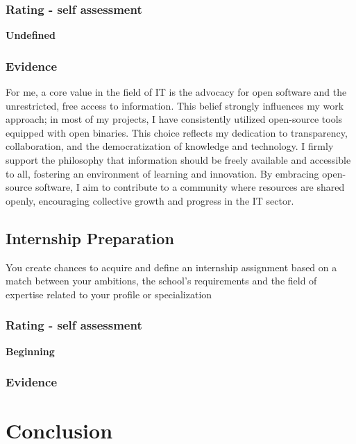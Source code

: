 \documentclass[a4paper, 11pt]{article}
\begin{document}
\subsubsection{Rating - self assessment}
\textbf{Undefined} 
\subsubsection{Evidence}
For me, a core value in the field of IT is the advocacy for open software and the unrestricted, free access to information. This belief strongly influences my work approach; in most of my projects, I have consistently utilized open-source tools equipped with open binaries. This choice reflects my dedication to transparency, collaboration, and the democratization of knowledge and technology. I firmly support the philosophy that information should be freely available and accessible to all, fostering an environment of learning and innovation. By embracing open-source software, I aim to contribute to a community where resources are shared openly, encouraging collective growth and progress in the IT sector.


\subsection{Internship Preparation}
You create chances to acquire and define an internship assignment based on a match between your ambitions, the school's requirements and the field of expertise related to your profile or specialization

\subsubsection{Rating - self assessment}
\textbf{Beginning} 
\subsubsection{Evidence}



\section{Conclusion}
\end{document}
